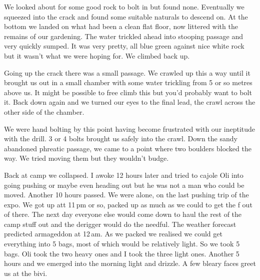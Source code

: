 We looked about for some good rock to bolt in but found none. Eventually we squeezed into the crack and found some suitable naturals to descend on. At the bottom we landed on what had been a clean flat floor, now littered with the remains of our gardening. The water trickled ahead into stooping passage and very quickly sumped. It was very pretty, all blue green against nice white rock but it wasn't what we were hoping for. We climbed back up.
 
Going up the crack there was a small passage. We crawled up this a way until it brought us out in a small chamber with some water trickling from 5 or so metres above us. It might be possible to free climb this but you'd probably want to bolt it. Back down again and we turned our eyes to the final lead, the crawl across the other side of the chamber.
 
We were hand bolting by this point having become frustrated with our ineptitude with the drill. 3 or 4 bolts brought us safely into the crawl. Down the sandy abandoned phreatic passage, we came to a point where two boulders blocked the way. We tried moving them but they wouldn't budge. 

 
Back at camp we collapsed. I awoke 12 hours later and tried to cajole Oli into going pushing or maybe even heading out but he was not a man who could be moved. Another 10 hours passed.  We were alone, on the last pushing trip of the expo. We got up att 11\,pm or so, packed up as much as we could to get the f out of there. The next day everyone else would come down to haul the rest of the camp stuff out and the derigger would do the needful. The weather forecast predicted armageddon at 12\,am. As we packed we realised we could get everything into 5 bags, most of which would be relatively light. So we took 5 bags. Oli took the two heavy ones and I took the three light ones. Another 5 hours and we emerged into the morning light and drizzle. A few bleary faces greet us at the bivi.


